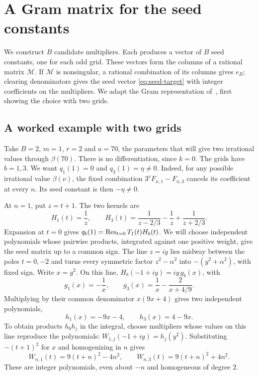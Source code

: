 \section{A Gram matrix for the seed constants}\label{sec:gram}

We construct $B$ candidate multipliers. Each produces a vector of
$B$ seed constants, one for each odd grid. These vectors form
the columns of a rational matrix $\mathcal M$. If $\mathcal M$
is nonsingular, a rational combination of its columns gives
$e_B$; clearing denominators gives the seed vector
\eqref{eq:seed-target} with integer coefficients on the multipliers.
We adapt the Gram representation of~\cite[Section~3]{Tcount},
first showing the choice with two grids.

\subsection{A worked example with two grids}\label{sec:worked-gram}

Take $B=2$, $m=1$, $r=2$ and $a=70$, the parameters that will
give two irrational values through $\beta(70)$. There is no
differentiation, since $k=0$. The grids have $b=1,3$.
We want $q_1(1)=0$ and $q_3(1)=\eta\ne0$. Indeed, for any
possible irrational value $\beta(\nu)$, the fixed combination
$3^\nu F_{n,1}-F_{n,3}$ cancels its coefficient at every $n$.
Its seed constant is then $-\eta\ne0$.

At $n=1$, put $z=t+1$. The two kernels are
\[
 H_1(t)=\frac1z,\qquad
 H_3(t)=\frac1{z-2/3}-\frac1z+\frac1{z+2/3}.
\]
Expansion at $t=0$ gives $q_b(1)=\operatorname{Res}_{t=0}T_1(t)H_b(t)$.
We will choose independent polynomials whose pairwise products,
integrated against one positive weight, give the seed matrix
up to a common sign. The line $z=iy$ lies midway between
the poles $t=0,-2$ and turns every symmetric factor
$z^2-\alpha^2$ into $-(y^2+\alpha^2)$, with fixed sign.
Write $x=y^2$. On this line,
$H_b(-1+iy)=iy\,g_b(x)$, with
\[
 g_1(x)=-\frac1x,\qquad
 g_3(x)=\frac1x-\frac2{x+4/9}.
\]
Multiplying by their common denominator $x(9x+4)$ gives
two independent polynomials,
\[
 h_1(x)=-9x-4,\qquad h_3(x)=4-9x.
\]
To obtain products $h_bh_j$ in the integral, choose multipliers
whose values on this line reproduce the polynomials:
$W_{1,j}(-1+iy)=h_j(y^2)$. Substituting $-(t+1)^2$ for $x$
and homogenizing in $n$ gives
\[
 W_{n,1}(t)=9(t+n)^2-4n^2,\qquad
 W_{n,3}(t)=9(t+n)^2+4n^2.
\]
These are integer polynomials, even about $-n$ and homogeneous
of degree $2$.

